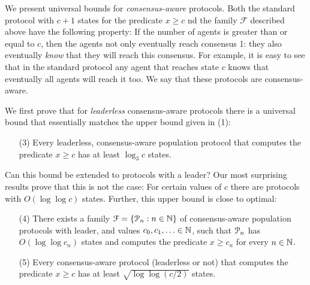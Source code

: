 We present universal bounds for \emph{consensus-aware} protocols. Both
the standard protocol with $c+1$ states for the predicate $x \geq c$
nd the family $\mathcal{F}$ described above have the following
property: If the number of agents is greater than or equal to $c$,
then the agents not only eventually reach consensus 1: they also
eventually \emph{know} that they will reach this consensus. For
example, it is easy to see that in the standard protocol any agent
that reaches state $c$ knows that eventually all agents will reach it
too. We say that these protocols are consensus-aware.

We first prove that for \emph{leaderless} consensus-aware protocols
there is a universal bound that essentially matches the upper bound
given in (1):
\begin{itemize}
\item[(3)] Every leaderless, consensus-aware population protocol that
  computes the predicate $x \geq c$ has at least $\log_3 c$ states.
\end{itemize}
Can this bound be extended to protocols with a leader? Our most
surprising results prove that this is not the case: For certain values
of $c$ there are protocols with $O(\log \log c)$ states. Further, this
upper bound is close to optimal:
\begin{itemize}
\item[(4)]There exists a family $\mathcal{F} = \{\mathcal{P}_n : n \in \mathbb{N}\}$
  of consensus-aware population protocols with leader, and values
  $c_0, c_1, \ldots \in \mathbb{N}$, such that $\mathcal{P}_n$ has $O(\log\log c_n)$
  states and computes the predicate $x \geq c_n$ for every $n \in \mathbb{N}$.
\item[(5)] Every consensus-aware protocol (leaderless or not) that
  computes the predicate $x \geq c$ has at least $\sqrt{\log \log(c /
    2)}$ states.
\end{itemize}

